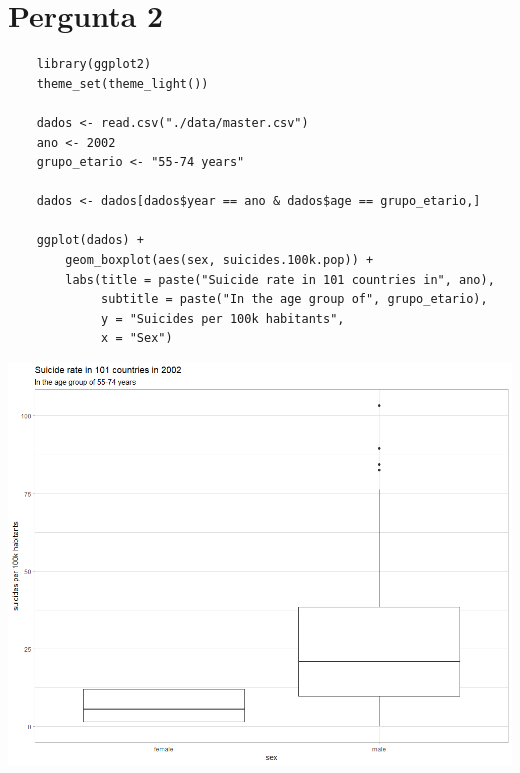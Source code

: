 \documentclass[11pt]{article}
\begin{document}
\section*{Pergunta 2}

\begin{lstlisting}
    library(ggplot2)
    theme_set(theme_light())
    
    dados <- read.csv("./data/master.csv")
    ano <- 2002
    grupo_etario <- "55-74 years"
    
    dados <- dados[dados$year == ano & dados$age == grupo_etario,]
    
    ggplot(dados) +
        geom_boxplot(aes(sex, suicides.100k.pop)) +
        labs(title = paste("Suicide rate in 101 countries in", ano),
             subtitle = paste("In the age group of", grupo_etario), 
             y = "Suicides per 100k habitants",
             x = "Sex")
\end{lstlisting}

\vspace{14pt}

\begin{center}
    \includegraphics[width=\linewidth]{pergunta_2.png}
\end{center}
\end{document}
